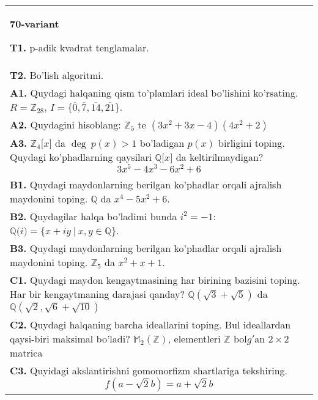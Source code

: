 \documentclass{article}
\begin{document}
\begin{tabular}{m{17cm}}
\textbf{70-variant}
\newline

\textbf{T1.} p-adik kvadrat tenglamalar. \\
\textbf{T2.} Bo'lish algoritmi. \\
\textbf{A1.} Quydagi halqaning qism to'plamlari ideal bo'lishini ko'rsating.
\(R = \mathbb{Z}_{28}\), \(I = \{\overline{0},\overline{7},\overline{14},\overline{21}\}\). \\
\textbf{A2.} Quydagini hisoblang:
\(\mathbb{Z}_{5}\) te \(\left( 3x^{2} + 3x - 4 \right)\left( 4x^{2} + 2 \right)\) \\
\textbf{A3.} \(\mathbb{Z}_{4}\lbrack x\rbrack\) da \(\deg\ p(x) > 1\) bo'ladigan \(p(x)\) birligini toping. Quydagi ko'phadlarning qaysilari \(\mathbb{Q\lbrack}x\rbrack\) da keltirilmaydigan?
\[3x^{5} - 4x^{3} - 6x^{2} + 6\] \\
\textbf{B1.} Quydagi maydonlarning berilgan ko'phadlar orqali ajralish maydonini toping.
\(\mathbb{Q}\) da \(x^{4} - 5x^{2} + 6\). \\
\textbf{B2.} Quydagilar halqa bo'ladimi bunda \(i^{2} = - 1\):
\(\mathbb{Q(}i) = \{ x + iy\ |\ x,y \in \mathbb{Q\}}\). \\
\textbf{B3.} Quydagi maydonlarning berilgan ko'phadlar orqali ajralish maydonini toping.
\(\mathbb{Z}_{5}\) da \(x^{2} + x + 1\). \\
\textbf{C1.} Quydagi maydon kengaytmasining har birining bazisini toping. Har bir kengaytmaning darajasi qanday?
\(\mathbb{Q}\left( \sqrt{3} + \sqrt{5} \right)\) da \(\mathbb{Q}\left( \sqrt{2},\sqrt{6} + \sqrt{10} \right)\) \\
\textbf{C2.} Quydagi halqaning barcha ideallarini toping. Bul ideallardan qaysi-biri maksimal bo'ladi?
\(\mathbb{M}_{2}\left( \mathbb{Z} \right)\), elementleri \(\mathbb{Z}\) bol\(g'\)an \(2 \times 2\) matrica \\
\textbf{C3.} Quyidagi akslantirishni gomomorfizm shartlariga tekshiring.
\[f\left( a - \sqrt{2}b \right) = a + \sqrt{2}b\] \\

\end{tabular}
\vspace{1cm}
\end{document}
